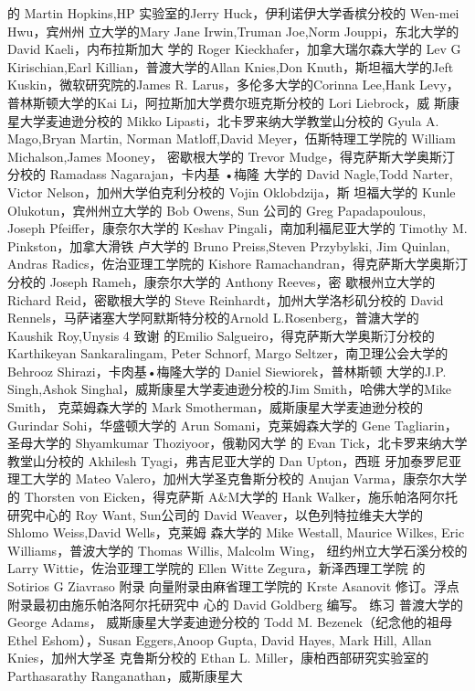 的 Martin Hopkins,HP 实验室的Jerry Huck，伊利诺伊大学香槟分校的 Wen-mei Hwu，宾州州
立大学的Mary Jane Irwin,Truman Joe,Norm Jouppi，东北大学的David Kaeli，内布拉斯加大
学的 Roger Kieckhafer，加拿大瑞尔森大学的 Lev G Kirischian,Earl Killian，普渡大学的Allan
Knies,Don Knuth，斯坦福大学的Jeft Kuskin，微软研究院的James R. Larus，多伦多大学的Corinna
Lee,Hank Levy，普林斯顿大学的Kai Li，阿拉斯加大学费尔班克斯分校的 Lori Liebrock，威
斯康星大学麦迪逊分校的 Mikko Lipasti，北卡罗来纳大学教堂山分校的 Gyula A. Mago,Bryan
Martin, Norman Matloff,David Meyer，伍斯特理工学院的 William Michalson,James Mooney，
密歇根大学的 Trevor Mudge，得克萨斯大学奥斯汀分校的 Ramadass Nagarajan，卡内基 •梅隆
大学的 David Nagle,Todd Narter, Victor Nelson，加州大学伯克利分校的 Vojin Oklobdzija，斯
坦福大学的 Kunle Olukotun，宾州州立大学的 Bob Owens, Sun 公司的 Greg Papadapoulous, Joseph
Pfeiffer，康奈尔大学的 Keshav Pingali，南加利福尼亚大学的 Timothy M. Pinkston，加拿大滑铁
卢大学的 Bruno Preiss,Steven Przybylski, Jim Quinlan, Andras Radics，佐治亚理工学院的 Kishore
Ramachandran，得克萨斯大学奥斯汀分校的 Joseph Rameh，康奈尔大学的 Anthony Reeves，密
歇根州立大学的 Richard Reid，密歇根大学的 Steve Reinhardt，加州大学洛杉矶分校的 David
Rennels，马萨诸塞大学阿默斯特分校的Arnold L.Rosenberg，普溏大学的 Kaushik Roy,Unysis
4
致谢
的Emilio Salgueiro，得克萨斯大学奥斯汀分校的 Karthikeyan Sankaralingam, Peter Schnorf, Margo
Seltzer，南卫理公会大学的 Behrooz Shirazi，卡肉基•梅隆大学的 Daniel Siewiorek，普林斯顿
大学的J.P. Singh,Ashok Singhal，威斯康星大学麦迪逊分校的Jim Smith，哈佛大学的Mike Smith，
克菜姆森大学的 Mark Smotherman，威斯康星大学麦迪逊分校的 Gurindar Sohi，华盛顿大学的
Arun Somani，克莱姆森大学的 Gene Tagliarin，圣母大学的 Shyamkumar Thoziyoor，俄勒冈大学
的 Evan Tick，北卡罗来纳大学教堂山分校的 Akhilesh Tyagi，弗吉尼亚大学的 Dan Upton，西班
牙加泰罗尼亚理工大学的 Mateo Valero，加州大学圣克鲁斯分校的 Anujan Varma，康奈尔大学
的 Thorsten von Eicken，得克萨斯 A&M大学的 Hank Walker，施乐帕洛阿尔托研究中心的 Roy
Want, Sun公司的 David Weaver，以色列特拉维夫大学的 Shlomo Weiss,David Wells，克莱姆
森大学的 Mike Westall, Maurice Wilkes, Eric Williams，普波大学的 Thomas Willis, Malcolm Wing，
纽约州立大学石溪分校的 Larry Wittie，佐治亚理工学院的 Ellen Witte Zegura，新泽西理工学院
的 Sotirios G Ziavraso
附录
向量附录由麻省理工学院的 Krste Asanovit 修订。浮点附录最初由施乐帕洛阿尔托研究中
心的 David Goldberg 编写。
练习
普渡大学的 George Adams，
威斯康星大学麦迪逊分校的 Todd M. Bezenek（纪念他的祖母
Ethel Eshom），Susan Eggers,Anoop Gupta, David Hayes, Mark Hill, Allan Knies，加州大学圣
克鲁斯分校的 Ethan L. Miller，康柏西部研究实验室的 Parthasarathy Ranganathan，威斯康星大
